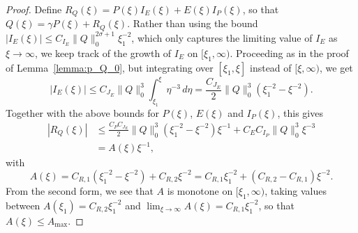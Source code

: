 \documentclass[11pt]{article}
\begin{document}
\begin{proof}
  Define
  \(R_{Q}(\xi) = P(\xi)I_{E}(\xi) + E(\xi)I_{P}(\xi)\), so that
  \(Q(\xi) = \gamma P(\xi) + R_{Q}(\xi)\). Rather than using the bound
  \(|I_{E}(\xi)| \leq C_{I_{E}}\|Q\|_{0}^{2\sigma + 1}\xi_{1}^{-2}\),
  which only captures the limiting value of \(I_{E}\) as
  \(\xi \to \infty\), we keep track of the growth of \(I_{E}\) on
  \([\xi_{1}, \infty)\). Proceeding as in the proof of
  Lemma~\ref{lemma:p_Q_0}, but integrating over \([\xi_{1}, \xi]\)
  instead of \([\xi, \infty)\), we get
  \begin{equation*}
    |I_{E}(\xi)|
    \leq C_{J_{E}}\|Q\|_{0}^{3}\int_{\xi_{1}}^{\xi}\eta^{-3}\,d\eta
    = \frac{C_{J_{E}}}{2}\|Q\|_{0}^{3}\left(\xi_{1}^{-2} - \xi^{-2}\right).
  \end{equation*}
  Together with the above bounds for \(P(\xi)\), \(E(\xi)\) and
  \(I_{P}(\xi)\), this gives
  \begin{equation*}
    \begin{split}
      |R_{Q}(\xi)|
      &\leq
        \frac{C_{P}C_{J_{E}}}{2}\|Q\|_{0}^{3}\left(\xi_{1}^{-2} - \xi^{-2}\right)\xi^{-1}
        + C_{E}C_{I_{P}}\|Q\|_{0}^{3}\xi^{-3}\\
      &= A(\xi)\xi^{-1},
    \end{split}
  \end{equation*}
  with
  \begin{equation*}
    A(\xi) = C_{R,1}\left(\xi_{1}^{-2} - \xi^{-2}\right) + C_{R,2}\xi^{-2}
    = C_{R,1}\xi_{1}^{-2} + (C_{R,2} - C_{R,1})\xi^{-2}.
  \end{equation*}
  From the second form, we see that \(A\) is monotone on
  \([\xi_{1}, \infty)\), taking values between
  \(A(\xi_{1}) = C_{R,2}\xi_{1}^{-2}\) and
  \(\lim_{\xi \to \infty} A(\xi) = C_{R,1}\xi_{1}^{-2}\), so that
  \(A(\xi) \leq A_{\max}\).


\end{proof}
\end{document}
